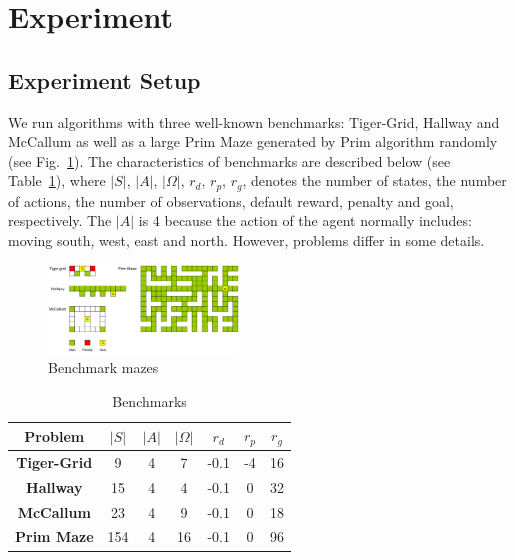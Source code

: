 \documentclass[conference]{IEEEtran}
\begin{document}
	\section{Experiment}
	
	\subsection{Experiment Setup}
	
	We run algorithms with three well-known benchmarks: Tiger-Grid, Hallway and McCallum 
	as well as a large Prim Maze generated by Prim algorithm randomly
	(see Fig.~\ref{fig:mazes}). The characteristics of benchmarks are described
	below (see Table~\ref{table:benchmarks}), where $|S|$, $|A|$, $|\Omega|$, $r_d$, $r_p$, $r_g$, 
	denotes the number of states, the number of actions, the number of observations, default
	reward, penalty and goal, respectively. The $|A|$ is 4 because the action of the agent
	normally includes: moving south, west, east and north. However, problems differ in some
	details.
	
	\begin{figure}[b]
		\centering
		\includegraphics[width=0.45\textwidth]{mazes.png}
		\caption{Benchmark mazes}
		\label{fig:mazes}
	\end{figure}


\begin{table}[b]
	\caption{Benchmarks}
	\begin{center}
		\begin{tabular}{|c|c|c|c|c|c|c|}
			\hline
			\textbf{Problem}&\textbf{$|S|$}&\textbf{$|A|$}&\textbf{$|\Omega|$}&\textbf{$r_d$}&\textbf{$r_p$}&\textbf{$r_g$}	\\
			\hline
			\textbf{Tiger-Grid}      &9         & 4        & 7           & -0.1    & -4    & 16  \\
			\textbf{Hallway}         & 15       & 4        & 4           & -0.1    & 0     & 32  \\
			\textbf{McCallum}        & 23       & 4        & 9           & -0.1    & 0     & 18  \\
			\textbf{Prim Maze}       & 154      & 4        & 16          & -0.1    & 0     & 96  \\
			\hline
		\end{tabular}
		\label{table:benchmarks}
	\end{center}
\end{table}
\end{document}
